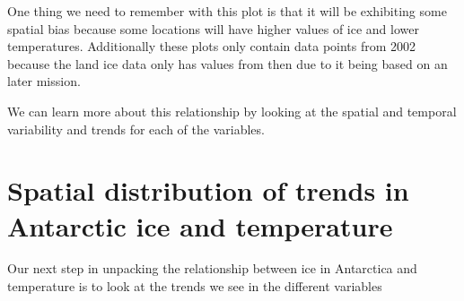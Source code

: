 \documentclass[../main.tex]{subfiles}
\begin{document}
One thing we need to remember with this plot is that it will be exhibiting some spatial bias because some locations will have higher values of ice and lower temperatures. Additionally these plots only contain data points from 2002 because the land ice data only has values from then due to it being based on an later mission. 

We can learn more about this relationship by looking at the spatial and temporal variability and trends for each of the variables.

\section[Spatial distribution of trends]{Spatial distribution of trends in Antarctic ice and temperature}
Our next step in unpacking the relationship between ice in Antarctica and temperature is to look at the trends we see in the different variables
\end{document}
